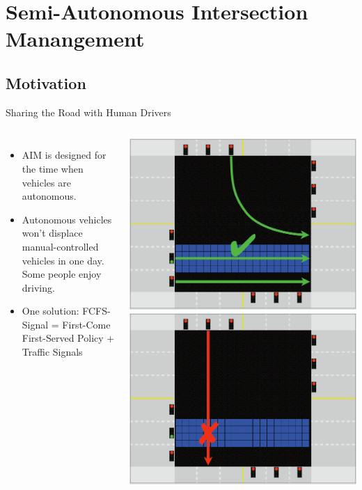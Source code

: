 \documentclass{beamer}
\begin{document}
\section{Semi-Autonomous Intersection Manangement}

\subsection{Motivation}

\begin{frame}{Sharing the Road with Human Drivers}
\begin{columns}[c]
\begin{itemize}
\item AIM is designed for the time when vehicles are autonomous.
\item Autonomous vehicles won't displace manual-controlled vehicles in
one day. Some people enjoy driving.\pause
\item One solution: FCFS-Signal = First-Come First-Served Policy +
Traffic Signals \cite{bib:Dresner08Multiagent}
\end{itemize}
\includegraphics[width=\textwidth]{fcfs-light-1.png}
\hfill
\includegraphics[width=\textwidth]{fcfs-light-2.png}
\end{columns}
\end{frame}
\end{document}

